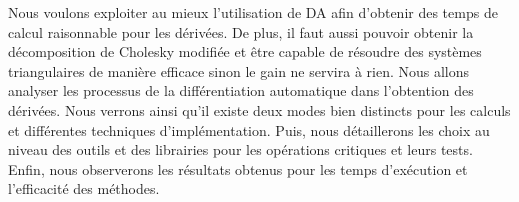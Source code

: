 Nous voulons exploiter au mieux l'utilisation de DA afin d'obtenir des temps de calcul raisonnable pour les d\'eriv\'ees. 
De plus, il faut aussi pouvoir obtenir la d\'ecomposition de Cholesky modifi\'ee et être capable de r\'esoudre des syst\`emes triangulaires de mani\`ere
efficace sinon le gain ne servira \`a rien.
 Nous allons analyser les processus de la diff\'erentiation automatique dans 
l'obtention des d\'eriv\'ees. Nous verrons ainsi qu'il existe deux modes bien distincts pour les calculs et diff\'erentes techniques 
d'impl\'ementation. Puis, nous d\'etaillerons les choix au niveau des outils et des librairies pour les op\'erations critiques et leurs tests.
 Enfin, nous observerons les r\'esultats obtenus pour les temps d'ex\'ecution et l'efficacit\'e des m\'ethodes.









